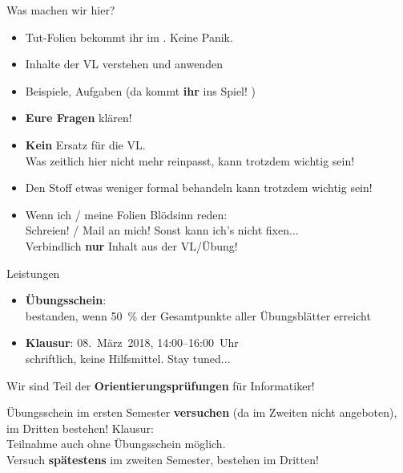 \begin{frame}[t]{Was machen wir hier?}
	\begin{itemize}[<+->]
		\item Tut-Folien bekommt ihr im \ILIAS. Keine Panik.
		\item Inhalte der VL verstehen und anwenden
		\item Beispiele, Aufgaben (da kommt \textbf{ihr} ins Spiel! \smiley)
		\item \textbf{Eure Fragen} klären! 
		\item \textbf{Kein} Ersatz für die VL. \\
			  Was zeitlich hier nicht mehr reinpasst, kann trotzdem wichtig sein!
	    \item Den Stoff etwas weniger formal behandeln \impl {} kann trotzdem wichtig sein! 
	    \item Wenn ich / meine Folien Blödsinn reden: \\
		      Schreien! / Mail an mich! \impl Sonst kann ich's nicht fixen... \frownie \\
		      Verbindlich \textbf{nur} Inhalt aus der VL/Übung! 
	\end{itemize}
\end{frame}

\begin{frame}{Leistungen}
	\begin{itemize}
		\item \textbf{Übungsschein}: \\
			  bestanden, wenn 50~\% der Gesamtpunkte aller Übungsblätter erreicht \\
		\item \textbf{Klausur}: 08.~März~2018, 14:00–16:00~Uhr \\
			  schriftlich, keine Hilfsmittel. \quad Stay tuned...
	\end{itemize}
	Wir sind Teil der \textbf{Orientierungsprüfungen} für Informatiker!
	\begin{itemize}
		\implitem Übungsschein im ersten Semester \textbf{versuchen} (da im Zweiten nicht angeboten), im Dritten bestehen! 
		\implitem Klausur: \\
		Teilnahme auch ohne Übungsschein möglich. \\
		Versuch \textbf{spätestens} im zweiten Semester, bestehen im Dritten!
	\end{itemize}
	
	\pause
\end{frame}

